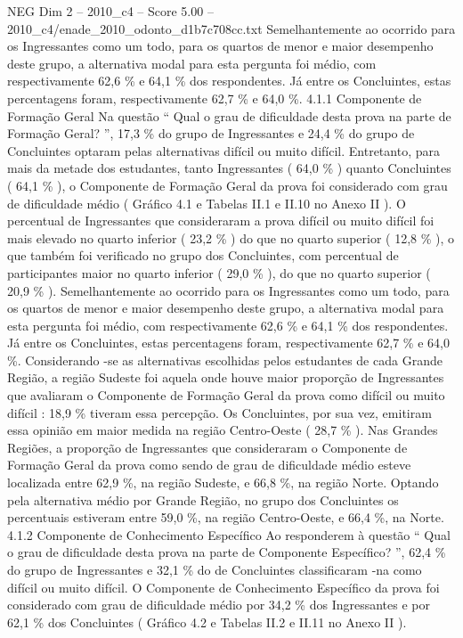 \begin{textsample}{NEG Dim 2 – 2010\_c4 – Score 5.00 – 2010\_c4/enade\_2010\_odonto\_d1b7c708cc.txt}
Semelhantemente ao ocorrido para os Ingressantes como um todo, para os quartos de menor e maior desempenho deste grupo, a alternativa modal para esta pergunta foi médio, com respectivamente 62,6 \% e 64,1 \% dos respondentes.
Já entre os Concluintes, estas percentagens foram, respectivamente 62,7 \% e 64,0 \%. 4.1.1 Componente de Formação Geral Na questão “ Qual o grau de dificuldade desta prova na parte de Formação Geral? ”, 17,3 \% do grupo de Ingressantes e 24,4 \% do grupo de Concluintes optaram pelas alternativas difícil ou muito difícil.
Entretanto, para mais da metade dos estudantes, tanto Ingressantes ( 64,0 \% ) quanto Concluintes ( 64,1 \% ), o Componente de Formação Geral da prova foi considerado com grau de dificuldade médio ( Gráfico 4.1 e Tabelas II.1 e II.10 no Anexo II ).
O percentual de Ingressantes que consideraram a prova difícil ou muito difícil foi mais elevado no quarto inferior ( 23,2 \% ) do que no quarto superior ( 12,8 \% ), o que também foi verificado no grupo dos Concluintes, com percentual de participantes maior no quarto inferior ( 29,0 \% ), do que no quarto superior ( 20,9 \% ).
Semelhantemente ao ocorrido para os Ingressantes como um todo, para os quartos de menor e maior desempenho deste grupo, a alternativa modal para esta pergunta foi médio, com respectivamente 62,6 \% e 64,1 \% dos respondentes.
Já entre os Concluintes, estas percentagens foram, respectivamente 62,7 \% e 64,0 \%.
Considerando -se as alternativas escolhidas pelos estudantes de cada Grande Região, a região Sudeste foi aquela onde houve maior proporção de Ingressantes que avaliaram o Componente de Formação Geral da prova como difícil ou muito difícil : 18,9 \% tiveram essa percepção.
Os Concluintes, por sua vez, emitiram essa opinião em maior medida na região Centro-Oeste ( 28,7 \% ).
Nas Grandes Regiões, a proporção de Ingressantes que consideraram o Componente de Formação Geral da prova como sendo de grau de dificuldade médio esteve localizada entre 62,9 \%, na região Sudeste, e 66,8 \%, na região Norte.
Optando pela alternativa médio por Grande Região, no grupo dos Concluintes os percentuais estiveram entre 59,0 \%, na região Centro-Oeste, e 66,4 \%, na Norte. 4.1.2 Componente de Conhecimento Específico Ao responderem à questão “ Qual o grau de dificuldade desta prova na parte de Componente Específico? ”, 62,4 \% do grupo de Ingressantes e 32,1 \% do de Concluintes classificaram -na como difícil ou muito difícil.
O Componente de Conhecimento Específico da prova foi considerado com grau de dificuldade médio por 34,2 \% dos Ingressantes e por 62,1 \% dos Concluintes ( Gráfico 4.2 e Tabelas II.2 e II.11 no Anexo II ).

\end{textsample}
